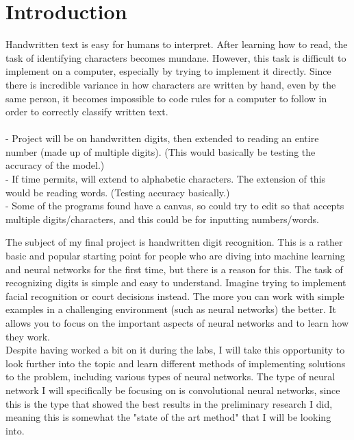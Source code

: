 \documentclass{article}
\begin{document}


\newpage

\section{Introduction}

Handwritten text is easy for humans to interpret. After learning how to read, the task of identifying characters becomes mundane. However, this task is difficult to implement on a computer, especially by trying to implement it directly. Since there is incredible variance in how characters are written by hand, even by the same person, it becomes impossible to code rules for a computer to follow in order to correctly classify written text.\\\\
- Project will be on handwritten digits, then extended to reading an entire number (made up of multiple digits). (This would basically be testing the accuracy of the model.)\\
- If time permits, will extend to alphabetic characters. The extension of this would be reading words. (Testing accuracy basically.)\\
- Some of the programs found have a canvas, so could try to edit so that accepts multiple digits/characters, and this could be for inputting numbers/words.



The subject of my final project is handwritten digit recognition. This is a rather basic and popular starting point for people who are diving into machine learning and neural networks for the first time, but there is a reason for this. The task of recognizing digits is simple and easy to understand. Imagine trying to implement facial recognition or court decisions instead. The more you can work with simple examples in a challenging environment (such as neural networks) the better. It allows you to focus on the important aspects of neural networks and to learn how they work.\\

Despite having worked a bit on it during the labs, I will take this opportunity to look further into the topic and learn different methods of implementing solutions to the problem, including various types of neural networks. The type of neural network I will specifically be focusing on is convolutional neural networks, since this is the type that showed the best results in the preliminary research I did, meaning this is somewhat the "state of the art method" that I will be looking into.\\
\end{document}
